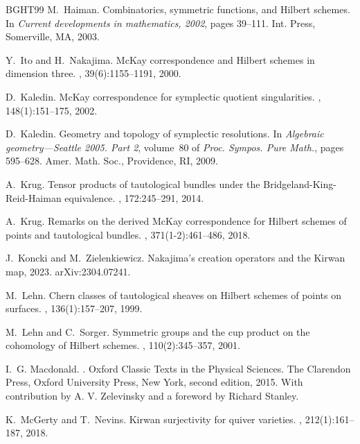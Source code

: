 \documentclass[12pt,a4paper]{amsart}
\theoremstyle{plain}
\theoremstyle{definition}
\theoremstyle{remark}
\begin{document}
\begin{thebibliography}{BGHT99}
	M.~Haiman.
	\newblock Combinatorics, symmetric functions, and {H}ilbert schemes.
	\newblock In {\em Current developments in mathematics, 2002}, pages 39--111.
	Int. Press, Somerville, MA, 2003.
	
	Y.~Ito and H.~Nakajima.
	\newblock Mc{K}ay correspondence and {H}ilbert schemes in dimension three.
	, 39(6):1155--1191, 2000.
	
	D.~Kaledin.
	\newblock Mc{K}ay correspondence for symplectic quotient singularities.
	, 148(1):151--175, 2002.
	
	D.~Kaledin.
	\newblock Geometry and topology of symplectic resolutions.
	\newblock In {\em Algebraic geometry---{S}eattle 2005. {P}art 2}, volume~80 of
	{\em Proc. Sympos. Pure Math.}, pages 595--628. Amer. Math. Soc., Providence,
	RI, 2009.
	
	A.~Krug.
	\newblock Tensor products of tautological bundles under the
	{B}ridgeland-{K}ing-{R}eid-{H}aiman equivalence.
	, 172:245--291, 2014.
	
	A.~Krug.
	\newblock Remarks on the derived {M}c{K}ay correspondence for {H}ilbert schemes
	of points and tautological bundles.
	, 371(1-2):461--486, 2018.
	
	J.~Koncki and M.~Zielenkiewicz.
	\newblock Nakajima's creation operators and the {K}irwan map, 2023.
	\newblock arXiv:2304.07241.
	
	M.~Lehn.
	\newblock Chern classes of tautological sheaves on {H}ilbert schemes of points
	on surfaces.
	, 136(1):157--207, 1999.
	
	M.~Lehn and C.~Sorger.
	\newblock Symmetric groups and the cup product on the cohomology of {H}ilbert
	schemes.
	, 110(2):345--357, 2001.
	
	I.~G. Macdonald.
	.
	\newblock Oxford Classic Texts in the Physical Sciences. The Clarendon Press,
	Oxford University Press, New York, second edition, 2015.
	\newblock With contribution by A. V. Zelevinsky and a foreword by Richard
	Stanley.
	
	K.~McGerty and T.~Nevins.
	\newblock Kirwan surjectivity for quiver varieties.
	, 212(1):161--187, 2018.
	

\end{thebibliography}
\end{document}
